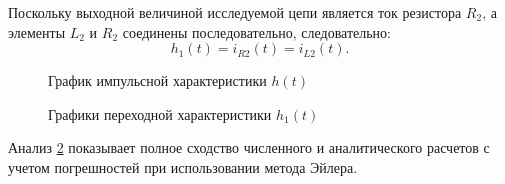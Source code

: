 Поскольку выходной величиной исследуемой цепи является ток резистора $R_2$, а элементы $L_2$ и $R_2$ соединены последовательно, следовательно:
\begin{equation}
    h_1(t) = i_{R2}(t) = i_{L2}(t).
\end{equation}

\begin{figure}[H]
    \centering
    
    \caption{График импульсной характеристики $h(t)$}
    \label{fig:plot_h}
\end{figure}

\begin{figure}[H]
    \centering
    
    \caption{Графики переходной характеристики $h_1(t)$}
    \label{fig:plot_h1}
\end{figure}

Анализ \cref{fig:plot_h1} показывает полное сходство численного и аналитического расчетов с учетом погрешностей при использовании метода Эйлера.